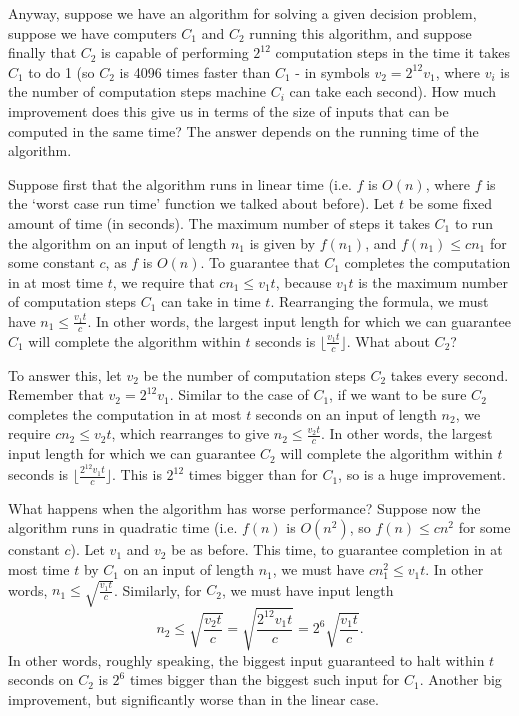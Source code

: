 \documentclass{article}
\theoremstyle{plain}
\theoremstyle{definition}
\begin{document}
Anyway, suppose we have an algorithm for solving a given decision problem, suppose we have computers $C_1$ and $C_2$ running this algorithm, and suppose finally that $C_2$ is capable of performing $2^{12}$ computation steps in the time it takes $C_1$ to do 1 (so $C_2$ is 4096 times faster than $C_1$ - in symbols $v_2 = 2^{12}v_1$, where $v_i$ is the number of computation steps machine $C_i$ can take each second). How much improvement does this give us in terms of the size of inputs that can be computed in the same time? The answer depends on the running time of the algorithm. 

Suppose first that the algorithm runs in linear time (i.e. $f$ is $O(n)$, where $f$ is the `worst case run time' function we talked about before). Let $t$ be some fixed amount of time (in seconds). The maximum number of steps it takes $C_1$ to run the algorithm on an input of length $n_1$ is given by $f(n_1)$, and $f(n_1)\leq cn_1$ for some constant $c$, as $f$ is $O(n)$. To guarantee that $C_1$ completes the computation in at most time $t$, we require that $cn_1\leq v_1t$, because $v_1t$ is the maximum number of computation steps $C_1$ can take in time $t$. Rearranging the formula, we must have $n_1\leq \frac{v_1t}{c}$. In other words, the largest input length for which we can guarantee $C_1$ will complete the algorithm within $t$ seconds is $\lfloor \frac{v_1t}{c}\rfloor$. What about $C_2$? 

To answer this, let $v_2$ be the number of computation steps $C_2$ takes every second. Remember that $v_2 = 2^{12}v_1$. Similar to the case of $C_1$, if we want to be sure $C_2$ completes the computation in at most $t$ seconds on an input of length $n_2$, we require $cn_2\leq v_2 t$, which rearranges to give $n_2\leq \frac{v_2t}{c}$. In other words, the largest input length for which we can guarantee $C_2$ will complete the algorithm within $t$ seconds is $\lfloor \frac{2^{12}v_1t}{c}\rfloor$. This is $2^{12}$ times bigger than for $C_1$, so is a huge improvement.

What happens when the algorithm has worse performance? Suppose now the algorithm runs in quadratic time (i.e. $f(n)$ is $O(n^2)$, so $f(n)\leq cn^2$ for some constant $c$). Let $v_1$ and $v_2$ be as before. This time, to guarantee completion in at most time $t$ by $C_1$ on an input of length $n_1$, we must have $cn_1^2\leq v_1t$. In other words, $n_1\leq \sqrt{\frac{v_1t}{c}}$. Similarly, for $C_2$, we must have input length \[n_2\leq \sqrt{\frac{v_2t}{c}}=\sqrt{\frac{2^{12}v_1t}{c}}= 2^6\sqrt{\frac{v_1t}{c}}.\]   
In other words, roughly speaking, the biggest input guaranteed to halt within $t$ seconds on $C_2$ is $2^6$ times bigger than the biggest such input for $C_1$. Another big improvement, but significantly worse than in the linear case.
\end{document}
